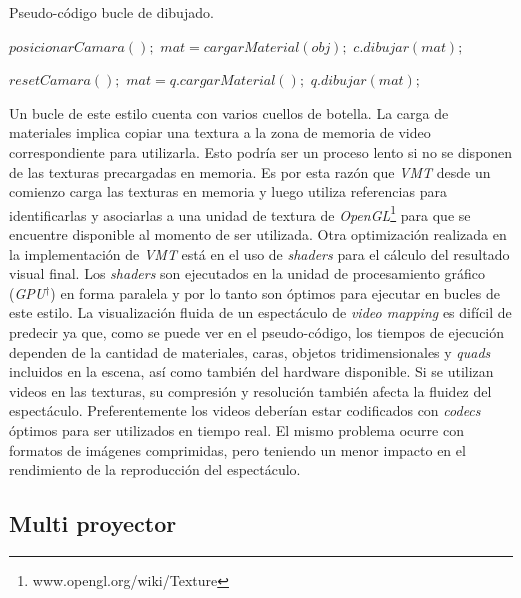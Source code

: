 \begin{algorithm}
    \caption{Pseudo-código bucle de dibujado.}
    \label{alg:mainLoop}
    \begin{algorithmic}
      \State $posicionarCamara();$
             \State $mat = cargarMaterial(obj);$
             \State $c.dibujar(mat);$
         \EndFor
      \EndFor

      \State $resetCamara();$
         \State $mat = q.cargarMaterial();$
         \State $q.dibujar(mat);$
      \EndFor
    \end{algorithmic}
\end{algorithm}

Un bucle de este estilo cuenta con varios cuellos de botella.
La carga de materiales implica copiar una textura a la zona de memoria de video correspondiente para utilizarla. Esto podría ser un proceso lento si no se disponen de las texturas precargadas en memoria. Es por esta razón que \emph{VMT} desde un comienzo carga las texturas en memoria y luego utiliza referencias para identificarlas y asociarlas a una unidad de textura de \emph{OpenGL}\footnote{www.opengl.org/wiki/Texture} para que se encuentre disponible al momento de ser utilizada.
Otra optimización realizada en la implementación de \emph{VMT} está en el uso de \emph{shaders} para el cálculo del resultado visual final. Los \emph{shaders} son ejecutados en la unidad de procesamiento gráfico (\emph{GPU}$^\dagger$) en forma paralela y por lo tanto son óptimos para ejecutar en bucles de este estilo.
La visualización fluida de un espectáculo de \emph{video mapping} es difícil de predecir ya que, como se puede ver en el pseudo-código, los tiempos de ejecución dependen de la cantidad de materiales, caras, objetos tridimensionales y \emph{quads} incluidos en la escena, así como también del hardware disponible.
Si se utilizan videos en las texturas, su compresión y resolución también afecta la fluidez del espectáculo. Preferentemente los videos deberían estar codificados con \emph{codecs} óptimos para ser utilizados en tiempo real. El mismo problema ocurre con formatos de imágenes comprimidas, pero teniendo un menor impacto en el rendimiento de la reproducción del espectáculo.

\subsection{Multi proyector}

